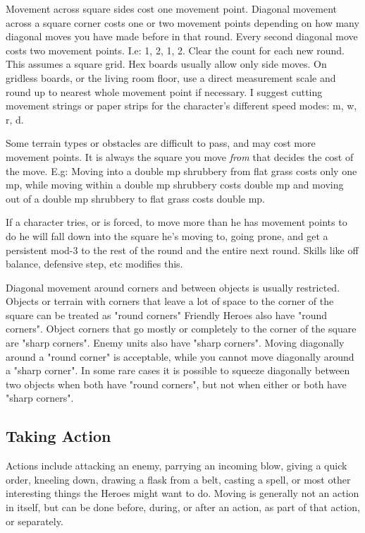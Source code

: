 Movement across square sides cost one movement point. Diagonal movement across a square corner costs one or two movement points depending on how many diagonal moves you have made before in that round. Every second diagonal move costs two movement points. I.e: 1, 2, 1, 2. Clear the count for each new round.
This assumes a square grid. Hex boards usually allow only side moves. On gridless boards, or the living room floor, use a direct measurement scale and round up to nearest whole movement point if necessary. I suggest cutting movement strings or paper strips for the character's different speed modes: m, w, r, d.

Some terrain types or obstacles are difficult to pass, and may cost more movement points. It is always the square you move \emph{from} that decides the cost of the move. E.g: Moving into a double mp shrubbery from flat grass costs only one mp, while moving within a double mp shrubbery costs double mp and moving out of a double mp shrubbery to flat grass costs double mp.

If a character tries, or is forced, to move more than he has movement points to do he will fall down into the square he's moving to, going prone, and get a persistent mod-3 to the rest of the round and the entire next round. Skills like off balance, defensive step, etc modifies this.

Diagonal movement around corners and between objects is usually restricted.
Objects or terrain with corners that leave a lot of space to the corner of the square can be treated as "round corners" Friendly Heroes also have "round corners".
Object corners that go mostly or completely to the corner of the square are "sharp corners". Enemy units also have "sharp corners".
Moving diagonally around a "round corner" is acceptable, while you cannot move diagonally around a "sharp corner". In some rare cases it is possible to squeeze diagonally between two objects when both have "round corners", but not when either or both have "sharp corners".




\subsection*{Taking Action}
Actions include attacking an enemy, parrying an incoming blow, giving a quick order, kneeling down, drawing a flask from a belt, casting a spell, or most other interesting things the Heroes might want to do. Moving is generally not an action in itself, but can be done before, during, or after an action, as part of that action, or separately.

